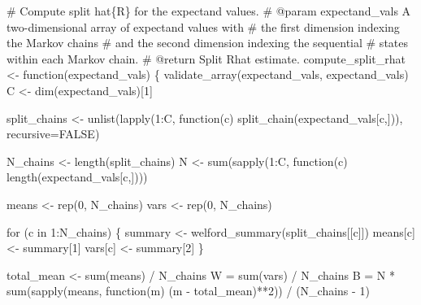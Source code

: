 \documentclass[
  letterpaper,
  DIV=11,
  numbers=noendperiod]{scrartcl}
\newenvironment{Shaded}{\begin{snugshade}}{\end{snugshade}}
\newcommand{\BuiltInTok}[1]{\textcolor[rgb]{0.00,0.23,0.31}{#1}}
\newcommand{\CommentTok}[1]{\textcolor[rgb]{0.37,0.37,0.37}{#1}}
\newcommand{\ControlFlowTok}[1]{\textcolor[rgb]{0.00,0.23,0.31}{#1}}
\newcommand{\DecValTok}[1]{\textcolor[rgb]{0.68,0.00,0.00}{#1}}
\newcommand{\KeywordTok}[1]{\textcolor[rgb]{0.00,0.23,0.31}{#1}}
\newcommand{\NormalTok}[1]{\textcolor[rgb]{0.00,0.23,0.31}{#1}}
\newcommand{\OperatorTok}[1]{\textcolor[rgb]{0.37,0.37,0.37}{#1}}
\newcommand{\StringTok}[1]{\textcolor[rgb]{0.13,0.47,0.30}{#1}}
\begin{document}
\begin{Shaded}
\begin{Highlighting}[]
\CommentTok{\# Compute split hat\{R\} for the expectand values.}
\CommentTok{\# @param expectand\_vals A two{-}dimensional array of expectand values with}
\CommentTok{\#                       the first dimension indexing the Markov chains}
\CommentTok{\#                       and the second dimension indexing the sequential}
\CommentTok{\#                       states within each Markov chain.}
\CommentTok{\# @return Split Rhat estimate.}
\NormalTok{compute\_split\_rhat }\OperatorTok{\textless{}{-}}\NormalTok{ function(expectand\_vals) \{}
\NormalTok{  validate\_array(expectand\_vals, }\StringTok{\textquotesingle{}expectand\_vals\textquotesingle{}}\NormalTok{)}
\NormalTok{  C }\OperatorTok{\textless{}{-}}\NormalTok{ dim(expectand\_vals)[}\DecValTok{1}\NormalTok{]}
  
\NormalTok{  split\_chains }\OperatorTok{\textless{}{-}}\NormalTok{ unlist(lapply(}\DecValTok{1}\NormalTok{:C, }
\NormalTok{                                function(c)}
\NormalTok{                                split\_chain(expectand\_vals[c,])),}
\NormalTok{                         recursive}\OperatorTok{=}\NormalTok{FALSE)}

\NormalTok{  N\_chains }\OperatorTok{\textless{}{-}}\NormalTok{ length(split\_chains)}
\NormalTok{  N }\OperatorTok{\textless{}{-}} \BuiltInTok{sum}\NormalTok{(sapply(}\DecValTok{1}\NormalTok{:C, function(c) length(expectand\_vals[c,])))}

\NormalTok{  means }\OperatorTok{\textless{}{-}}\NormalTok{ rep(}\DecValTok{0}\NormalTok{, N\_chains)}
  \BuiltInTok{vars} \OperatorTok{\textless{}{-}}\NormalTok{ rep(}\DecValTok{0}\NormalTok{, N\_chains)}

  \ControlFlowTok{for}\NormalTok{ (c }\KeywordTok{in} \DecValTok{1}\NormalTok{:N\_chains) \{}
\NormalTok{    summary }\OperatorTok{\textless{}{-}}\NormalTok{ welford\_summary(split\_chains[[c]])}
\NormalTok{    means[c] }\OperatorTok{\textless{}{-}}\NormalTok{ summary[}\DecValTok{1}\NormalTok{]}
    \BuiltInTok{vars}\NormalTok{[c] }\OperatorTok{\textless{}{-}}\NormalTok{ summary[}\DecValTok{2}\NormalTok{]}
\NormalTok{  \}}

\NormalTok{  total\_mean }\OperatorTok{\textless{}{-}} \BuiltInTok{sum}\NormalTok{(means) }\OperatorTok{/}\NormalTok{ N\_chains}
\NormalTok{  W }\OperatorTok{=} \BuiltInTok{sum}\NormalTok{(}\BuiltInTok{vars}\NormalTok{) }\OperatorTok{/}\NormalTok{ N\_chains}
\NormalTok{  B }\OperatorTok{=}\NormalTok{ N }\OperatorTok{*} \BuiltInTok{sum}\NormalTok{(sapply(means, function(m)}
\NormalTok{                            (m }\OperatorTok{{-}}\NormalTok{ total\_mean)}\OperatorTok{**}\DecValTok{2}\NormalTok{)) }\OperatorTok{/}\NormalTok{ (N\_chains }\OperatorTok{{-}} \DecValTok{1}\NormalTok{)}


\end{Highlighting}
\end{Shaded}
\end{document}
